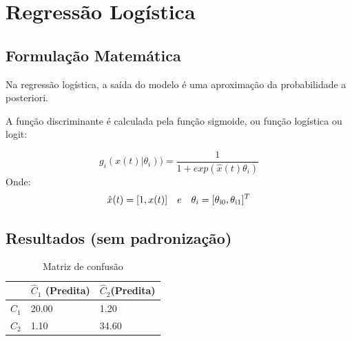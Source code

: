 \documentclass[11pt,a4paper]{article}
\numberwithin{equation}{section}
\begin{document}
\section{Regressão Logística}
\subsection{Formulação Matemática}
Na regressão logística, a saída do modelo é uma aproximação da probabilidade a posteriori.

A função discriminante é calculada pela função sigmoide, ou função logística ou logit:

\[g_i(x(t)|\theta_i))  = \frac{1}{1+ exp(\hat{x}(t)\theta_i)}\]
Onde:
\[\hat{x}(t) = [1,x(t)] \quad e \quad \theta_i=[\theta\textsubscript{i0},\theta\textsubscript{i1}]^T\]

\subsection{Resultados (sem padronização)}

\begin{table}[H]
\centering
\caption{Matriz de confusão}
\begin{tabular}{l l l}
\hline
 & \textbf{$\hat{C}_1$ (Predita)} & \textbf{$\hat{C}_2$(Predita)}\\
\hline
$C_1$ & 20.00&1.20\\ 
$C_2$ & 1.10&34.60\\  
\hline
\end{tabular}
\end{table}
\end{document}
